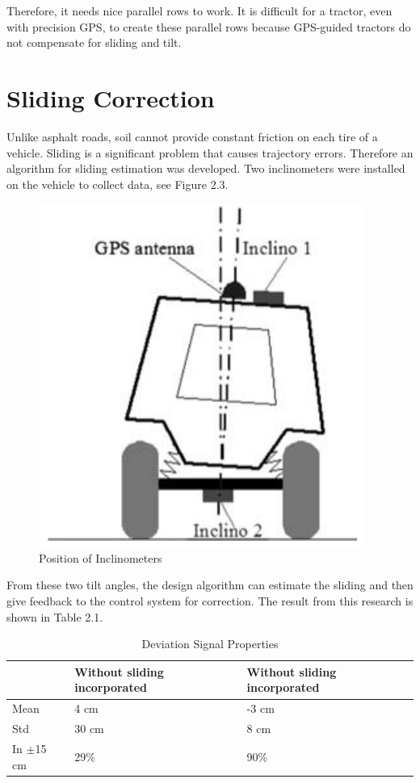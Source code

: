 Therefore, it needs nice parallel rows to work. It is difficult for a tractor, even with precision GPS, to create these parallel rows because GPS-guided tractors do not compensate for sliding and tilt.

\section{Sliding Correction}
Unlike asphalt roads, soil cannot provide constant friction on each tire of a vehicle. Sliding is a significant problem that causes trajectory errors. Therefore an algorithm for sliding estimation was developed. Two inclinometers were installed on the vehicle to collect data, see Figure 2.3. 
\begin{figure}[ht!]
\begin{center}
\includegraphics[scale = 0.4]{pics/slidingcorrection.png}
\caption{Position of Inclinometers}
\end{center}
\end{figure}
From these two tilt angles, the design algorithm can estimate the sliding and then give feedback to the control system for correction. The result from this research is shown in Table 2.1. \cite{lenain2006high}
\begin{table}[ht!]
\caption{Deviation Signal Properties}
\begin{center}	
\begin{tabular}{|l|l|l|}
\hline
 & Without sliding incorporated & Without sliding incorporated \\ 
\hline
Mean & 4 cm & -3 cm \\
\hline
Std &  30 cm & 8 cm\\
\hline
In $\pm$15 cm & 29\% & 90\%\\
\hline

\end{tabular}
\end{center}					
\end{table}
